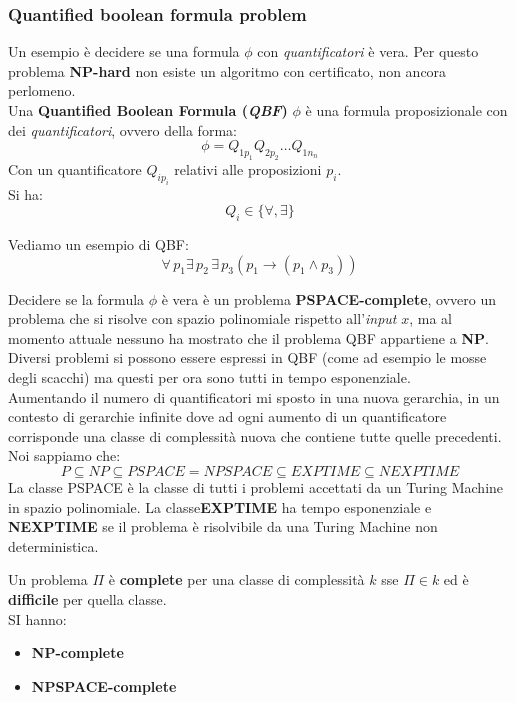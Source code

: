 \subsubsection{Quantified boolean formula problem}
Un esempio è decidere se una formula $\phi$ con \textit{quantificatori} è
vera. Per questo problema \textbf{NP-hard} non esiste un algoritmo con
certificato, non ancora perlomeno.\\
Una \textbf{Quantified Boolean Formula (\textit{QBF})} $\phi$ è una formula
proposizionale con dei \textit{quantificatori}, ovvero della forma:
\[\phi=Q_{1p_1}Q_{2p_2}\ldots Q_{1n_n}\]
Con un quantificatore $Q_{ip_i}$ relativi alle proposizioni $p_i$.\\
Si ha:
\[Q_i\in\{\forall,\exists\}\]
\begin{esempio}
  Vediamo un esempio di QBF:
  \[\forall\, p_1\exists\,p_2\,\exists\, p_3(p_1\to(p_1\land p_3))\]
\end{esempio}
Decidere se la formula $\phi$ è vera è un problema \textbf{PSPACE-complete},
ovvero un problema che si risolve con spazio polinomiale rispetto all'\textit{input} $x$,
ma al momento attuale nessuno ha mostrato che il problema QBF appartiene a
\textbf{NP}.\\
Diversi problemi si possono essere espressi in QBF (come ad esempio le mosse degli
scacchi) ma questi per ora sono tutti in tempo esponenziale.\\
Aumentando il numero di quantificatori mi sposto in una nuova gerarchia, in un
contesto di gerarchie infinite dove ad ogni aumento di un quantificatore
corrisponde una classe di complessità nuova che contiene tutte quelle
precedenti.\\
Noi sappiamo che:
\[P\subseteq NP\subseteq PSPACE=NPSPACE\subseteq EXPTIME\subseteq NEXPTIME\]
La classe PSPACE è la classe di tutti i problemi accettati da un Turing Machine
in spazio polinomiale. La classe\textbf{EXPTIME} ha tempo esponenziale e
\textbf{NEXPTIME} se il problema è risolvibile da una Turing Machine non
deterministica.
\begin{definizione}
  Un problema $\Pi$ è \textbf{complete} per una classe di complessità $k$ sse 
  $\Pi\in k$ ed è \textbf{difficile} per quella classe.\\
  SI hanno:
  \begin{itemize}
    \item \textbf{NP-complete}
    \item \textbf{NPSPACE-complete}
  \end{itemize}
\end{definizione}

